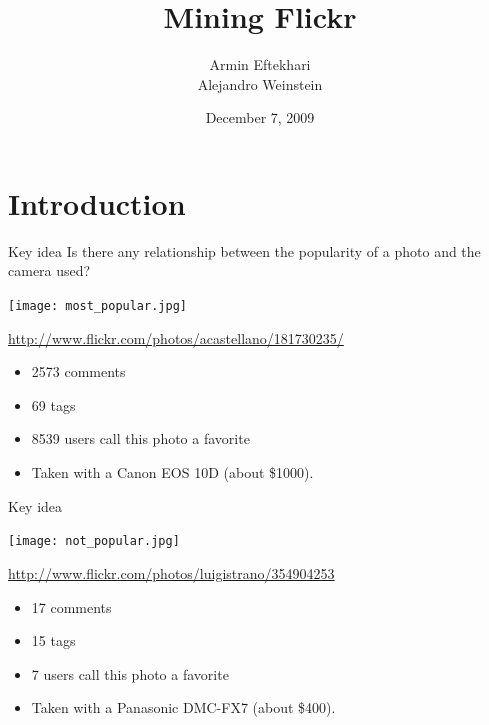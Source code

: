 \documentclass[ignorenonframetext]{beamer}
\title[] %
{Mining Flickr}
\subtitle
{} %
\author[AE-AJW]%
{Armin Eftekhari \\ Alejandro Weinstein}
\institute[CSM] %
{Division of Engineering\\
  Colorado School of Mines}
\date {December 7, 2009}%
\begin{document}


\everymath{\displaystyle}
\begin{frame}
  \titlepage
\end{frame}

\section{Introduction}

\begin{frame}{Key idea}
Is there any relationship between the popularity of a photo and the camera used?
\begin{center}
\texttt{[image: most\_popular.jpg]}
\begin{center}
\tiny{\url{http://www.flickr.com/photos/acastellano/181730235/}}
\end{center}
\end{center}
\begin{itemize}
\item 2573 comments
\item 69 tags
\item 8539 users call this photo a favorite
\item Taken with a Canon EOS 10D (about \$1000).
\end{itemize}
\end{frame}

\begin{frame}{Key idea}
\begin{center}
\texttt{[image: not\_popular.jpg]}
\begin{center}
\tiny{\url{http://www.flickr.com/photos/luigistrano/354904253}}
\end{center}
\end{center}
\begin{itemize}
\item 17 comments
\item 15 tags
\item 7 users call this photo a favorite
\item Taken with a Panasonic DMC-FX7 (about \$400).
\end{itemize}
\end{frame}
\end{document}
